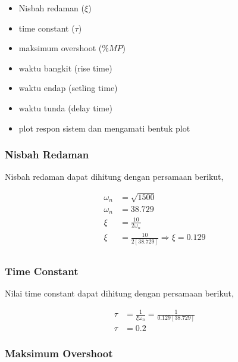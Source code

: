 \documentclass[../laporan]{subfiles}
\begin{document}
\begin{itemize}
    \item Nisbah redaman ($\xi$)
    \item time constant ($\tau$)
    \item maksimum overshoot ($\%MP$)
    \item waktu bangkit (rise time)
    \item waktu endap (setling time)
    \item waktu tunda (delay time)
    \item plot respon sistem dan mengamati bentuk plot
\end{itemize}

\subsubsection{Nisbah Redaman}

Nisbah redaman dapat dihitung dengan persamaan berikut,

\begin{equation}
    \begin{split}
        \omega_n &= \sqrt{1500}\\[5pt]
        \omega_n &= 38.729\\[10pt]
        \xi &= \frac{10}{2\omega_n} \\[5pt]
        \xi &= \frac{10}{2[38.729]} \Rightarrow \xi = 0.129 \\[5pt]
    \end{split}
\end{equation}

\subsubsection{Time Constant}

Nilai time constant dapat dihitung dengan persamaan berikut,

\begin{equation}
    \begin{split}
        \tau &= \frac{1}{\xi\omega_n} = \frac{1}{0.129[38.729]} \\[5pt]
        \tau &= 0.2
    \end{split}
\end{equation}

\subsubsection{Maksimum Overshoot}
\end{document}
